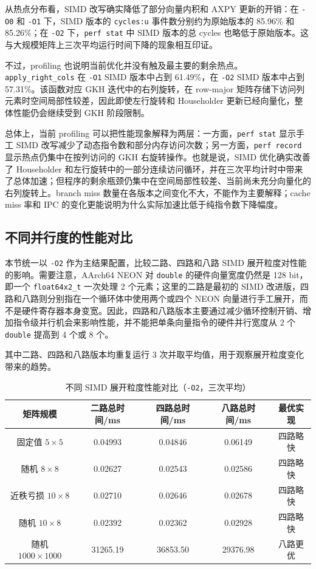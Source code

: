 \documentclass[UTF8,a4paper]{ctexart}
\begin{document}
从热点分布看，SIMD 改写确实降低了部分向量内积和 AXPY 更新的开销：在 \texttt{-O0} 和 \texttt{-O1} 下，SIMD 版本的 \texttt{cycles:u} 事件数分别约为原始版本的 85.96\% 和 85.26\%；在 \texttt{-O2} 下，\texttt{perf stat} 中 SIMD 版本的总 cycles 也略低于原始版本。这与大规模矩阵上三次平均运行时间下降的现象相互印证。

不过，profiling 也说明当前优化并没有触及最主要的剩余热点。\texttt{apply\_right\_cols} 在 \texttt{-O1} SIMD 版本中占到 61.49\%，在 \texttt{-O2} SIMD 版本中占到 57.31\%。该函数对应 GKH 迭代中的右列旋转，在 row-major 矩阵存储下访问列元素时空间局部性较差，因此即使左行旋转和 Householder 更新已经向量化，整体性能仍会继续受到 GKH 阶段限制。

总体上，当前 profiling 可以把性能现象解释为两层：一方面，\texttt{perf stat} 显示手工 SIMD 改写减少了动态指令数和部分内存访问次数；另一方面，\texttt{perf record} 显示热点仍集中在按列访问的 GKH 右旋转操作。也就是说，SIMD 优化确实改善了 Householder 和左行旋转中的一部分连续访问循环，并在三次平均计时中带来了总体加速；但程序的剩余瓶颈仍集中在空间局部性较差、当前尚未充分向量化的右列旋转上。branch miss 数量在各版本之间变化不大，不能作为主要解释；cache miss 率和 IPC 的变化更能说明为什么实际加速比低于纯指令数下降幅度。

\subsection{不同并行度的性能对比}
本节统一以 \texttt{-O2} 作为主结果配置，比较二路、四路和八路 SIMD 展开粒度对性能的影响。需要注意，AArch64 NEON 对 \texttt{double} 的硬件向量宽度仍然是 128 bit，即一个 \texttt{float64x2\_t} 一次处理 2 个元素；这里的二路是最初的 SIMD 改进版，四路和八路则分别指在一个循环体中使用两个或四个 NEON 向量进行手工展开，而不是硬件寄存器本身变宽。因此，四路和八路版本主要通过减少循环控制开销、增加指令级并行机会来影响性能，并不能把单条向量指令的硬件并行宽度从 2 个 \texttt{double} 提高到 4 个或 8 个。

其中二路、四路和八路版本均重复运行 3 次并取平均值，用于观察展开粒度变化带来的趋势。

\begin{table}[H]
  \centering
  \small
  \begin{tabular}{ccccc}
    \toprule
    矩阵规模 & 二路总时间/ms & 四路总时间/ms & 八路总时间/ms & 最优实现 \\
    \midrule
    固定值 $5\times5$ & 0.04993 & 0.04846 & 0.06149 & 四路略快 \\
    随机 $8\times8$ & 0.02627 & 0.02543 & 0.02586 & 四路略快 \\
    近秩亏损 $10\times8$ & 0.02710 & 0.02646 & 0.02678 & 四路略快 \\
    随机 $10\times8$ & 0.02392 & 0.02362 & 0.02928 & 四路略快 \\
    随机 $1000\times1000$ & 31265.19 & 36853.50 & 29376.98 & 八路更优 \\
    \bottomrule
  \end{tabular}
  \caption{不同 SIMD 展开粒度性能对比（\texttt{-O2}，三次平均）}
  \label{tab:simd-width}
\end{table}
\end{document}
